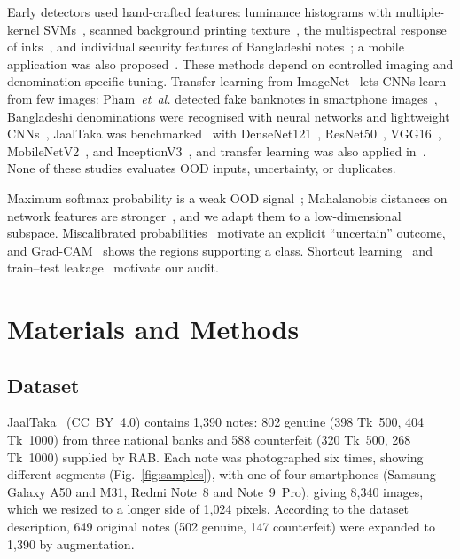 \documentclass[journal,onecolumn]{IEEEtran}
\begin{document}
Early detectors used hand-crafted features: luminance histograms with multiple-kernel
SVMs~\cite{yeh2011}, scanned background printing texture~\cite{berenguel2016}, the
multispectral response of inks~\cite{baek2018}, and individual security features of
Bangladeshi notes~\cite{uddin2016}; a mobile application was also
proposed~\cite{dittimi2018}. These methods depend on controlled imaging and
denomination-specific tuning. Transfer learning from
ImageNet~\cite{deng2009imagenet,yosinski2014transferable} lets CNNs learn from few
images: Pham~\textit{et~al.} detected fake banknotes in smartphone
images~\cite{pham2020,pham2022}, Bangladeshi denominations were recognised with neural
networks and lightweight CNNs~\cite{jahangir2007,linkon2020}, JaalTaka was
benchmarked~\cite{piyas2025jaaltaka} with DenseNet121~\cite{huang2017densenet},
ResNet50~\cite{he2016resnet}, VGG16~\cite{simonyan2015vgg},
MobileNetV2~\cite{sandler2018mobilenetv2}, and InceptionV3~\cite{szegedy2016inception},
and transfer learning was also applied in~\cite{tabassum2025}. None of these studies
evaluates OOD inputs, uncertainty, or duplicates.

Maximum softmax probability is a weak OOD signal~\cite{hendrycks2017baseline};
Mahalanobis distances on network features are stronger~\cite{lee2018mahalanobis}, and
we adapt them to a low-dimensional subspace. Miscalibrated
probabilities~\cite{guo2017calibration} motivate an explicit ``uncertain'' outcome, and
Grad-CAM~\cite{selvaraju2017gradcam} shows the regions supporting a class. Shortcut
learning~\cite{geirhos2020shortcut} and train--test leakage~\cite{kapoor2023leakage}
motivate our audit.

\section{Materials and Methods}
\label{sec:method}

\subsection{Dataset}
\label{sec:data}

JaalTaka~\cite{piyas2025jaaltaka,jaaltaka_data} (CC~BY~4.0) contains 1{,}390 notes:
802 genuine (398 Tk~500, 404 Tk~1000) from three national banks and 588 counterfeit
(320 Tk~500, 268 Tk~1000) supplied by RAB. Each note was photographed six times, showing
different segments (Fig.~\ref{fig:samples}), with one of four smartphones (Samsung Galaxy
A50 and M31, Redmi Note~8 and Note~9~Pro), giving 8{,}340 images, which we resized to a
longer side of 1{,}024 pixels. According to the dataset description, 649 original notes
(502 genuine, 147 counterfeit) were expanded to 1{,}390 by augmentation.
\end{document}
